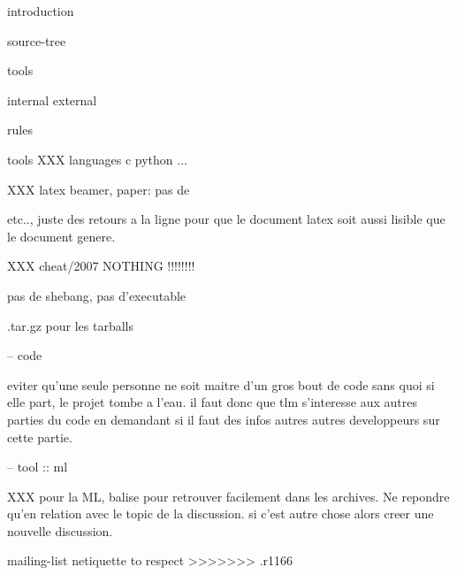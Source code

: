 introduction

source-tree

tools

  internal
  external

rules

  tools
    XXX
  languages
    c
    python
    ...

XXX latex
beamer, %
paper: pas de \par etc.., juste des retours a la ligne pour que le document
latex soit aussi lisible que le document genere.

XXX cheat/2007 NOTHING !!!!!!!!

pas de shebang, pas d'executable

.tar.gz pour les tarballs

-- code

eviter qu'une seule personne ne soit maitre d'un gros bout de code sans
quoi si elle part, le projet tombe a l'eau. il faut donc que tlm s'interesse
aux autres parties du code en demandant si il faut des infos autres autres
developpeurs sur cette partie.

-- tool :: ml

XXX pour la ML, balise pour retrouver facilement dans les archives.
Ne repondre qu'en relation avec le topic de la discussion. si c'est autre
chose alors creer une nouvelle discussion.

mailing-list netiquette to respect
>>>>>>> .r1166
